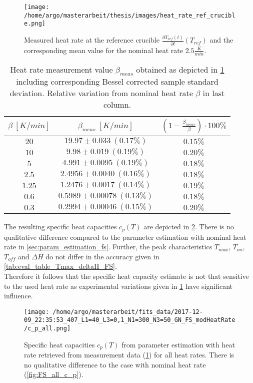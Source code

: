 \documentclass{scrartcl}[12pt, halfparskip]
\numberwithin{equation}{section}
\numberwithin{figure}{section}
\numberwithin{table}{section}
\begin{document}
\begin{figure}[H]
	\centering
	\texttt{[image: /home/argo/masterarbeit/thesis/images/heat\_rate\_ref\_crucible.png]}
	\caption{Measured heat rate at the reference crucible $\frac{\partial T_{ref}(t)}{\partial t}(T_{ref})$ and the corresponding mean value for the nominal heat rate $2.5 \frac{K}{min}$.}
	\label{fig:heat_rate_measurement}
\end{figure}

\begin{table}[H]
	\centering
	\begin{tabular}{| c | c | c |} \hline 
		$\beta \ [K/min]$ & $\beta_{meas} \ [K/min]$ & $\left(1 - \frac{\beta_{meas}}{\beta}\right) \cdot 100\%$  \\ \hline
		$20$ & $19.97 \pm 0.033 \ (0.17\%)$ & $0.15\%$ \\
		$10$ & $9.98 \pm 0.019 \ (0.19\%)$ & $0.20\%$ \\
		$5$ & $4.991 \pm 0.0095 \ (0.19\%)$ & $0.18\%$ \\
		$2.5$ & $2.4956 \pm 0.0040 \ (0.16\%)$ & $0.18\%$ \\
		$1.25$ & $1.2476 \pm 0.0017 \ (0.14\%)$ & $0.19\%$ \\
		$0.6$ & $0.5989 \pm 0.00078 \ (0.13\%)$ & $0.18\%$ \\
		$0.3$ & $0.2994 \pm 0.00046 \ (0.15\%)$ & $0.20\%$ \\ \hline
	\end{tabular}
	\caption{Heat rate measurement value $\beta_{meas}$ obtained as depicted in \cref{fig:heat_rate_measurement} including corresponding Bessel corrected sample standard deviation. Relative variation from nominal heat rate $\beta$ in last column.}
	\label{tab:mod_heat_rate}
\end{table}

The resulting specific heat capacities $c_p(T)$ are depicted in \cref{fig:FS_all_c_p_modHeatRate}. There is no qualitative difference compared to the parameter estimation with nominal heat rate in \cref{sec:param_estimation_fs}. Further, the peak characteristics $T_{max}$, $T_{on}$, $T_{off}$ and $\Delta H$ do not differ in the accuracy given in \cref{tab:eval_table_Tmax_deltaH_FS}. \\
Therefore it follows that the specific heat capacity estimate is not that sensitive to the used heat rate as experimental variations given in \cref{tab:mod_heat_rate} have significant influence.



\begin{figure}[H]
	\centering
	\texttt{[image: /home/argo/masterarbeit/fits\_data/2017-12-09\_22:35:53\_407\_L1=40\_L3=0,1\_N1=300\_N3=50\_GN\_FS\_modHeatRate/c\_p\_all.png]}
	\caption{Specific heat capacities $c_p(T)$ from parameter estimation with heat rate retrieved from measurement data (\cref{tab:mod_heat_rate}) for all heat rates. There is no qualitative difference to the case with nominal heat rate (\cref{fig:FS_all_c_p}).}
	\label{fig:FS_all_c_p_modHeatRate}
\end{figure}
\end{document}
